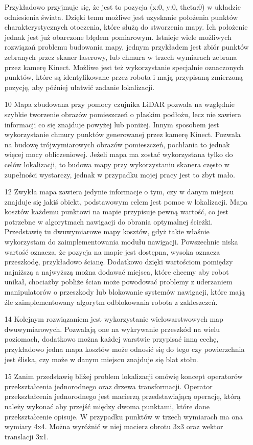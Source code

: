 \documentclass[10pt,a4paper]{article}
\begin{document}
\begin{itemize}
    Przykładowo przyjmuje się, że jest to pozycja (x:0, y:0, theta:0) w układzie odniesienia świata.
    Dzięki temu możliwe jest uzyskanie położenia punktów charakterystycznych otoczenia, które służą do stworzenia mapy. Ich położenie jednak jest już obarczone błędem pomiarowym.
    Istnieje wiele możliwych rozwiązań problemu budowania mapy, jednym przykładem jest zbiór punktów zebranych przez skaner laserowy, lub chmura w trzech wymiarach zebrana przez kamerę Kinect.
    Możliwe jest też wykorzystanie specjalnie oznaczonych punktów, które są identyfikowane przez robota i mają przypisaną zmierzoną pozycję, aby później ułatwić zadanie lokalizacji.
    \item[10]
    Mapa zbudowana przy pomocy czujnika LiDAR pozwala na względnie szybkie tworzenie obrazów pomieszczeń o płaskim podłożu, lecz nie zawiera informacji co się znajduje powyżej lub poniżej.
   Innym sposobem jest wykorzystanie chmury punktów generowanej przez kamerę Kinect. Pozwala na budowę trójwymiarowych obrazów pomieszczeń, pochłania to jednak więcej mocy obliczeniowej. 
    Jeżeli mapa ma zostać wykorzystana tylko do celów lokalizacji, to budowa mapy przy wykorzystaniu skanera często w zupełności wystarczy, jednak w przypadku mojej pracy jest to zbyt mało.
    \item[12]
    Zwykła mapa zawiera jedynie informacje o tym, czy w danym miejscu znajduje się jakiś obiekt, podstawowym celem jest pomoc w lokalizacji.
Mapa kosztów każdemu punktowi na mapie przypisuje pewną wartość, co jest potrzebne w algorytmach nawigacji do obrania optymalnej ścieżki. 
Przedstawię tu dwuwymiarowe mapy kosztów, gdyż takie właśnie wykorzystam do zaimplementowania modułu nawigacji. 
Powszechnie niska wartość oznacza, że pozycja na mapie jest dostępna, wysoka oznacza przeszkodę, przykładowo ścianę. 
Dodatkowo dzięki wartościom pomiędzy najniższą a najwyższą można dodawać miejsca, które chcemy aby robot unikał, chociażby pobliże ścian może powodować problemy z uderzaniem manipulatorów o przeszkody lub blokowanie systemów nawigacji, które mają źle zaimplementowany algorytm odblokowania robota z zakleszczeń.
		\item[14]
		Kolejnym rozwiązaniem jest wykorzystanie wielowarstwowych map dwuwymiarowych.
    Pozwalają one na wykrywanie przeszkód na wielu poziomach, dodatkowo można każdej warstwie przypisać inną cechę, przykładowo jedna mapa kosztów może odnosić się do tego czy powierzchnia jest śliska, czy może w danym miejscu znajduje się blat stołu. 
    \item[15]
    Zanim przedstawię bliżej problem lokalizacji omówię koncept operatorów przekształcenia jednorodnego oraz drzewa transformacji.
Operator przekształcenia jednorodnego jest macierzą przedstawiającą operację, którą należy wykonać aby przejść między dwoma punktami, które dane przekształcenie opisuje.
W przypadku punktów w trzech wymiarach ma ona wymiary 4x4. Można wyróżnić w niej macierz obrotu 3x3 oraz wektor translacji 3x1.


\end{itemize}
\end{document}
